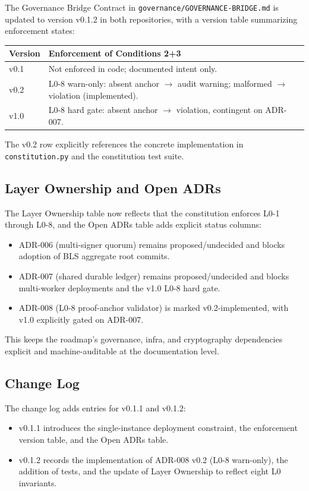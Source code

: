 \documentclass[11pt]{article}
\begin{document}
The Governance Bridge Contract in \texttt{governance/GOVERNANCE-BRIDGE.md} is updated to version v0.1.2 in both repositories, with a version table summarizing enforcement states:\cite{cite:44,cite:46,cite:47}
\begin{center}
\begin{tabular}{lll}
\toprule
Version & Enforcement of Conditions 2+3 \\
\midrule
v0.1 & Not enforced in code; documented intent only. \\
v0.2 & L0-8 warn-only: absent anchor $\rightarrow$ audit warning; malformed $\rightarrow$ violation (implemented). \\
v1.0 & L0-8 hard gate: absent anchor $\rightarrow$ violation, contingent on ADR-007. \\
\bottomrule
\end{tabular}
\end{center}
The v0.2 row explicitly references the concrete implementation in \texttt{constitution.py} and the constitution test suite.\cite{cite:46,cite:47}

\subsection{Layer Ownership and Open ADRs}

The Layer Ownership table now reflects that the constitution enforces L0-1 through L0-8, and the Open ADRs table adds explicit status columns:\cite{cite:46,cite:47}
\begin{itemize}[nosep]
  \item ADR-006 (multi-signer quorum) remains proposed/undecided and blocks adoption of BLS aggregate root commits.
  \item ADR-007 (shared durable ledger) remains proposed/undecided and blocks multi-worker deployments and the v1.0 L0-8 hard gate.
  \item ADR-008 (L0-8 proof-anchor validator) is marked v0.2-implemented, with v1.0 explicitly gated on ADR-007.\cite{cite:46,cite:47}
\end{itemize}
This keeps the roadmap's governance, infra, and cryptography dependencies explicit and machine-auditable at the documentation level.

\subsection{Change Log}

The change log adds entries for v0.1.1 and v0.1.2:\cite{cite:44,cite:46,cite:47}
\begin{itemize}[nosep]
  \item v0.1.1 introduces the single-instance deployment constraint, the enforcement version table, and the Open ADRs table.
  \item v0.1.2 records the implementation of ADR-008 v0.2 (L0-8 warn-only), the addition of tests, and the update of Layer Ownership to reflect eight L0 invariants.
\end{itemize}
\end{document}

